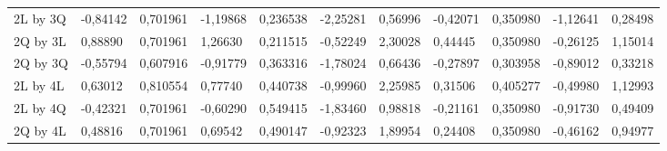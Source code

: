 \begin{table}[H]
{\begin{tabular}{lllllllllll}
\rowcolor[HTML]{FFFFFF} 
{\color[HTML]{000000} 2L by 3Q}       & {\color[HTML]{000000} -0,84142} & {\color[HTML]{000000} 0,701961} & {\color[HTML]{000000} -1,19868} & {\color[HTML]{000000} 0,236538} & {\color[HTML]{000000} -2,25281}       & {\color[HTML]{000000} 0,56996}        & {\color[HTML]{000000} -0,42071} & {\color[HTML]{000000} 0,350980}      & {\color[HTML]{000000} -1,12641}       & {\color[HTML]{000000} 0,28498}        \\
\rowcolor[HTML]{FFFFFF} 
{\color[HTML]{000000} 2Q by 3L}       & {\color[HTML]{000000} 0,88890}  & {\color[HTML]{000000} 0,701961} & {\color[HTML]{000000} 1,26630}  & {\color[HTML]{000000} 0,211515} & {\color[HTML]{000000} -0,52249}       & {\color[HTML]{000000} 2,30028}        & {\color[HTML]{000000} 0,44445}  & {\color[HTML]{000000} 0,350980}      & {\color[HTML]{000000} -0,26125}       & {\color[HTML]{000000} 1,15014}        \\
\rowcolor[HTML]{FFFFFF} 
{\color[HTML]{000000} 2Q by 3Q}       & {\color[HTML]{000000} -0,55794} & {\color[HTML]{000000} 0,607916} & {\color[HTML]{000000} -0,91779} & {\color[HTML]{000000} 0,363316} & {\color[HTML]{000000} -1,78024}       & {\color[HTML]{000000} 0,66436}        & {\color[HTML]{000000} -0,27897} & {\color[HTML]{000000} 0,303958}      & {\color[HTML]{000000} -0,89012}       & {\color[HTML]{000000} 0,33218}        \\
\rowcolor[HTML]{FFFFFF} 
{\color[HTML]{000000} 2L by 4L}       & {\color[HTML]{000000} 0,63012}  & {\color[HTML]{000000} 0,810554} & {\color[HTML]{000000} 0,77740}  & {\color[HTML]{000000} 0,440738} & {\color[HTML]{000000} -0,99960}       & {\color[HTML]{000000} 2,25985}        & {\color[HTML]{000000} 0,31506}  & {\color[HTML]{000000} 0,405277}      & {\color[HTML]{000000} -0,49980}       & {\color[HTML]{000000} 1,12993}        \\
\rowcolor[HTML]{FFFFFF} 
{\color[HTML]{000000} 2L by 4Q}       & {\color[HTML]{000000} -0,42321} & {\color[HTML]{000000} 0,701961} & {\color[HTML]{000000} -0,60290} & {\color[HTML]{000000} 0,549415} & {\color[HTML]{000000} -1,83460}       & {\color[HTML]{000000} 0,98818}        & {\color[HTML]{000000} -0,21161} & {\color[HTML]{000000} 0,350980}      & {\color[HTML]{000000} -0,91730}       & {\color[HTML]{000000} 0,49409}        \\
\rowcolor[HTML]{FFFFFF} 
{\color[HTML]{000000} 2Q by 4L}       & {\color[HTML]{000000} 0,48816}  & {\color[HTML]{000000} 0,701961} & {\color[HTML]{000000} 0,69542}  & {\color[HTML]{000000} 0,490147} & {\color[HTML]{000000} -0,92323}       & {\color[HTML]{000000} 1,89954}        & {\color[HTML]{000000} 0,24408}  & {\color[HTML]{000000} 0,350980}      & {\color[HTML]{000000} -0,46162}       & {\color[HTML]{000000} 0,94977}        \\

\end{tabular}}
\end{table}
